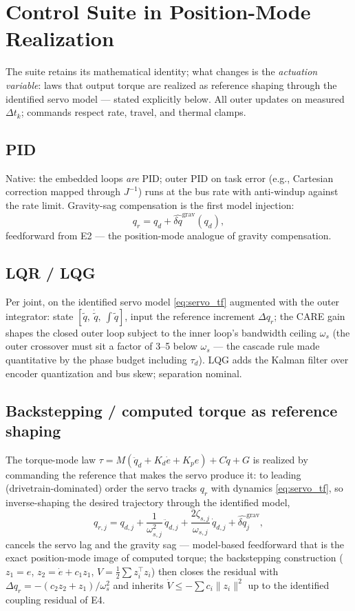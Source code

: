 \documentclass[conference]{IEEEtran}
\begin{document}
\section{Control Suite in Position-Mode Realization}
The suite retains its mathematical identity; what changes is the \emph{actuation variable}: laws that output torque are realized as reference shaping through the identified servo model --- stated explicitly below. All outer updates on measured $\Delta t_k$; commands respect rate, travel, and thermal clamps.

\subsection{PID}
Native: the embedded loops \emph{are} PID; outer PID on task error (e.g., Cartesian correction mapped through $J^{-1}$) runs at the bus rate with anti-windup against the rate limit. Gravity-sag compensation is the first model injection:
\begin{equation}
q_r = q_d + \widehat{\delta q}^{\mathrm{grav}}(q_d),
\end{equation}
feedforward from E2 --- the position-mode analogue of gravity compensation.

\subsection{LQR / LQG}
Per joint, on the identified servo model \eqref{eq:servo_tf} augmented with the outer integrator: state $[\tilde q,\ \dot{\tilde q},\ \int\tilde q]$, input the reference increment $\Delta q_r$; the CARE gain shapes the closed outer loop subject to the inner loop's bandwidth ceiling $\omega_s$ (the outer crossover must sit a factor of 3--5 below $\omega_s$ --- the cascade rule made quantitative by the phase budget including $\tau_d$). LQG adds the Kalman filter over encoder quantization and bus skew; separation nominal.

\subsection{Backstepping / computed torque as reference shaping}
The torque-mode law $\tau = M(\ddot q_d + K_d\dot e + K_p e) + C\dot q + G$ is realized by commanding the reference that makes the servo produce it: to leading (drivetrain-dominated) order the servo tracks $q_r$ with dynamics \eqref{eq:servo_tf}, so inverse-shaping the desired trajectory through the identified model,
\begin{equation}
q_{r,j} = q_{d,j} + \frac{1}{\omega_{s,j}^2}\,\ddot q_{d,j} + \frac{2\zeta_{s,j}}{\omega_{s,j}}\,\dot q_{d,j} + \widehat{\delta q}_j^{\mathrm{grav}},
\label{eq:refshape}
\end{equation}
cancels the servo lag and the gravity sag --- model-based feedforward that is the exact position-mode image of computed torque; the backstepping construction ($z_1 = e$, $z_2 = \dot e + c_1 z_1$, $V = \tfrac12\sum z_i^{\!\top}z_i$) then closes the residual with $\Delta q_r = -(c_2 z_2 + z_1)/\omega_s^2$ and inherits $\dot V \le -\sum c_i\|z_i\|^2$ up to the identified coupling residual of E4.
\end{document}
